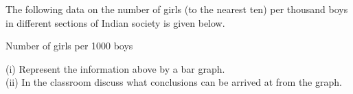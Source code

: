  The following data on the number of girls (to the nearest ten) per thousand boys in different sections of Indian society is given below.\\
 \begin{table}[ht!]
\centering

\caption{Number of girls per 1000 boys}
\label{table:input_38}
\end{table}
(i) Represent the information above by a bar graph.\\
(ii) In the classroom discuss what conclusions can be arrived at from the graph.\\
